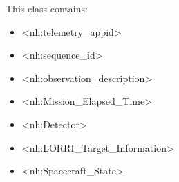 \documentclass[letterpaper,10pt,english]{sphinxmanual}
\begin{document}
\sphinxAtStartPar
This class contains:
\begin{itemize}
\item {} 
\sphinxAtStartPar
\textless{}nh:telemetry\_appid\textgreater{}

\item {} 
\sphinxAtStartPar
\textless{}nh:sequence\_id\textgreater{}

\item {} 
\sphinxAtStartPar
\textless{}nh:observation\_description\textgreater{}

\item {} 
\sphinxAtStartPar
\textless{}nh:Mission\_Elapsed\_Time\textgreater{}

\item {} 
\sphinxAtStartPar
\textless{}nh:Detector\textgreater{}

\item {} 
\sphinxAtStartPar
\textless{}nh:LORRI\_Target\_Information\textgreater{}

\item {} 
\sphinxAtStartPar
\textless{}nh:Spacecraft\_State\textgreater{}

\end{itemize}
\end{document}
